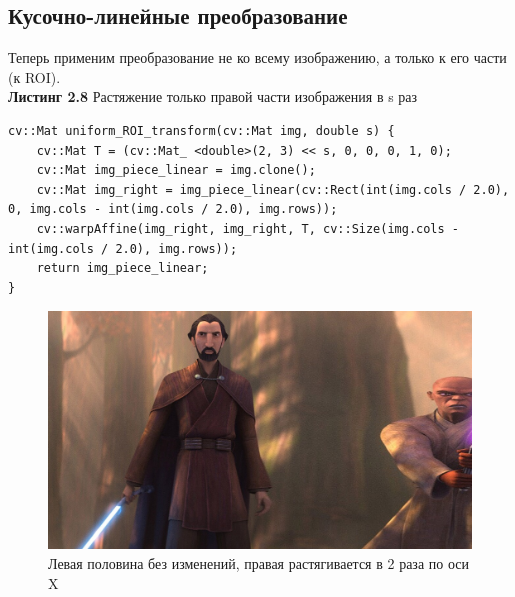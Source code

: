 \subsection{ Кусочно-линейные преобразование    }
Теперь применим преобразование не ко всему изображению, а только к его части (к ROI).
\\
\noindent \textbf{Листинг 2.8} Растяжение только правой части изображения в s раз 
\begin{lstlisting}
cv::Mat uniform_ROI_transform(cv::Mat img, double s) {
    cv::Mat T = (cv::Mat_ <double>(2, 3) << s, 0, 0, 0, 1, 0);
    cv::Mat img_piece_linear = img.clone();
    cv::Mat img_right = img_piece_linear(cv::Rect(int(img.cols / 2.0), 0, img.cols - int(img.cols / 2.0), img.rows));
    cv::warpAffine(img_right, img_right, T, cv::Size(img.cols - int(img.cols / 2.0), img.rows));
    return img_piece_linear;
}

\end{lstlisting}
\begin{figure}[h]
    \centering
    \includegraphics[scale=0.3]{"../images/results/roi_transformed_img.jpg"}
    \caption{Левая половина без изменений,  правая растягивается в 2 раза по оси X}
\end{figure}
\newpage

